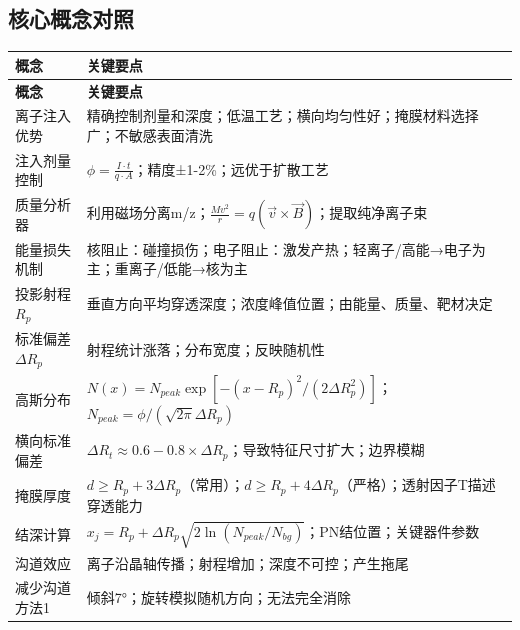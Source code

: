 \documentclass[UTF8,12pt,a4paper]{ctexart}
\begin{document}
\subsection{核心概念对照}

\begin{longtable}{|L{4cm}|L{11cm}|}
\hline
\textbf{概念} & \textbf{关键要点} \\
\hline
\endfirsthead
\hline
\textbf{概念} & \textbf{关键要点} \\
\hline
\endhead
\hline
\endfoot
\hline
\endlastfoot

离子注入优势 & 精确控制剂量和深度；低温工艺；横向均匀性好；掩膜材料选择广；不敏感表面清洗 \\
\hline

注入剂量控制 & $\phi = \frac{I \cdot t}{q \cdot A}$；精度±1-2\%；远优于扩散工艺 \\
\hline

质量分析器 & 利用磁场分离m/z；$\frac{Mv^2}{r} = q(\vec{v} \times \vec{B})$；提取纯净离子束 \\
\hline

能量损失机制 & 核阻止：碰撞损伤；电子阻止：激发产热；轻离子/高能→电子为主；重离子/低能→核为主 \\
\hline

投影射程$R_p$ & 垂直方向平均穿透深度；浓度峰值位置；由能量、质量、靶材决定 \\
\hline

标准偏差$\Delta R_p$ & 射程统计涨落；分布宽度；反映随机性 \\
\hline

高斯分布 & $N(x) = N_{peak}\exp[-(x-R_p)^2/(2\Delta R_p^2)]$；$N_{peak} = \phi/(\sqrt{2\pi}\Delta R_p)$ \\
\hline

横向标准偏差 & $\Delta R_t \approx 0.6-0.8 \times \Delta R_p$；导致特征尺寸扩大；边界模糊 \\
\hline

掩膜厚度 & $d \geq R_p + 3\Delta R_p$（常用）；$d \geq R_p + 4\Delta R_p$（严格）；透射因子T描述穿透能力 \\
\hline

结深计算 & $x_j = R_p + \Delta R_p\sqrt{2\ln(N_{peak}/N_{bg})}$；PN结位置；关键器件参数 \\
\hline

沟道效应 & 离子沿晶轴传播；射程增加；深度不可控；产生拖尾 \\
\hline

减少沟道方法1 & 倾斜7°；旋转模拟随机方向；无法完全消除 \\
\hline


\end{longtable}
\end{document}
